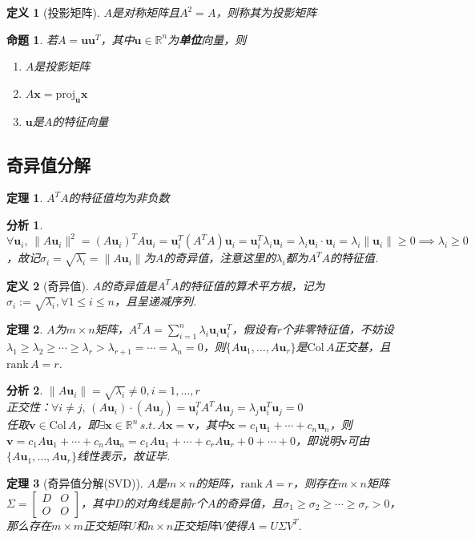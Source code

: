 \documentclass[11pt,UTF8]{ctexart}
\newtheorem{theorem}{定理}
\newtheorem{definition}{定义}
\newtheorem{proposition}{命题}
\newtheorem*{analysis}{分析}
\def\vx{\mathbf{x}}
\def\vv{\mathbf{v}}
\def\vu{\mathbf{u}}
\def\dis{\displaystyle}
\def\rn{\mathbb{R}^n}
\def\rank{\mathrm{rank}\,}
\def\col{\mathrm{Col}\,}
\newcommand{\proj}[1]{\mathrm{proj}_{#1}}
\begin{document}
\begin{definition}[投影矩阵]
$A$是对称矩阵且$A^2=A$，则称其为投影矩阵
\end{definition}
\begin{proposition}
若$A=\vu\vu^T$，其中$\vu\in\rn$为\textbf{单位}向量，则
\begin{enumerate}
	\itemsep -3pt
	\item $A$是投影矩阵
	\item $A\vx=\proj{\vu}\vx$
	\item $\vu$是$A$的特征向量
\end{enumerate}
\end{proposition}

\subsection{奇异值分解}%
\begin{theorem}
$A^TA$的特征值均为非负数
\end{theorem}
\begin{analysis}
$\forall\vu_i,\,\|A\vu_i\|^2=(A\vu_i)^TA\vu_i=\vu_i^T(A^TA)\vu_i=\vu_i^T\lambda_i\vu_i=\lambda_i\vu_i\cdot\vu_i=\lambda_i\|\vu_i\|\geq 0\implies \lambda_i\geq 0$，故记$\sigma_i=\sqrt{\lambda_i}=\|A\vu_i\|$为$A$的奇异值，注意这里的$\lambda_i$都为$A^TA$的特征值.
\end{analysis}
\begin{definition}[奇异值]
$A$的奇异值是$A^TA$的特征值的算术平方根，记为$\sigma_i:=\sqrt{\lambda_i},\forall 1\leq i\leq n$，且呈递减序列.
\end{definition}
\begin{theorem}
$A$为$m\times n$矩阵，$\dis A^TA=\sum_{i=1}^n\lambda_i\vu_i\vu_i^T$，假设有$r$个非零特征值，不妨设$\lambda_1\geq\lambda_2\geq\cdots\geq\lambda_r>\lambda_{r+1}=\cdots=\lambda_n=0$，则$\{A\vu_1,\dots,A\vu_r\}$是$\col A$正交基，且$\rank A=r$.
\end{theorem}
\begin{analysis}
$\|A\vu_i\|=\sqrt{\lambda_i}\ne 0,i=1,\dots,r$\\
正交性：$\forall i\ne j,\,(A\vu_i)\cdot(A\vu_j)=\vu_i^TA^TA\vu_j=\lambda_j\vu_i^T\vu_j=0$\\
任取$\vv\in\col A$，即$\exists\vx\in\rn\,s.t.\,A\vx=\vv$，其中$\vx=c_1\vu_1+\cdots+c_n\vu_n$，则$\vv=c_1A\vu_1+\cdots+c_nA\vu_n=c_1A\vu_1+\cdots+c_rA\vu_r+0+\cdots+0$，即说明$\vv$可由$\{A\vu_1,\dots,A\vu_r\}$线性表示，故证毕.
\end{analysis}
\begin{theorem}[奇异值分解(SVD)]
$A$是$m\times n$的矩阵，$\rank A=r$，则存在$m\times n$矩阵$\Sigma=\begin{bmatrix}D&O\\O&O\end{bmatrix}$，其中$D$的对角线是前$r$个$A$的奇异值，且$\sigma_1\geq\sigma_2\geq\cdots\geq\sigma_r>0$，那么存在$m\times m$正交矩阵$U$和$n\times n$正交矩阵$V$使得$A=U\Sigma V^T$.
\end{theorem}
\end{document}
